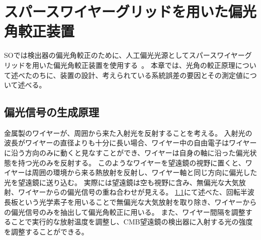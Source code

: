 \documentclass[../../main.tex]{subfiles}
\begin{document}
\chapter{スパースワイヤーグリッドを用いた偏光角較正装置}
SOでは検出器の偏光角較正のために、人工偏光光源としてスパースワイヤーグリッドを用いた偏光角較正装置を使用する~\cite{swg:Murata_2023}。
本章では、光角の較正原理について述べたのちに、装置の設計、考えられている系統誤差の要因とその測定値について述べる。

\section{偏光信号の生成原理}
金属製のワイヤーが、周囲から来た入射光を反射することを考える。
入射光の波長がワイヤーの直径よりも十分に長い場合、ワイヤー中の自由電子はワイヤーに沿う方向のみに動くと見なすことができ、ワイヤーは自身の軸に沿った偏光状態を持つ光のみを反射する。
このようなワイヤーを望遠鏡の視野に置くと、ワイヤーは周囲の環境から来る熱放射を反射し、ワイヤー軸と同じ方向に偏光した光を望遠鏡に送り込む。
実際には望遠鏡は空も視野に含み、無偏光な大気放射、ワイヤーからの偏光信号の重ね合わせが見える。
\ref{}にて述べた、回転半波長板という光学素子を用いることで無偏光な大気放射を取り除き、ワイヤーからの偏光信号のみを抽出して偏光角較正に用いる。
また、ワイヤー間隔を調整することで実行的な放射温度を調整し、CMB望遠鏡の検出器に入射する光の強度を調整することができる。
\end{document}
